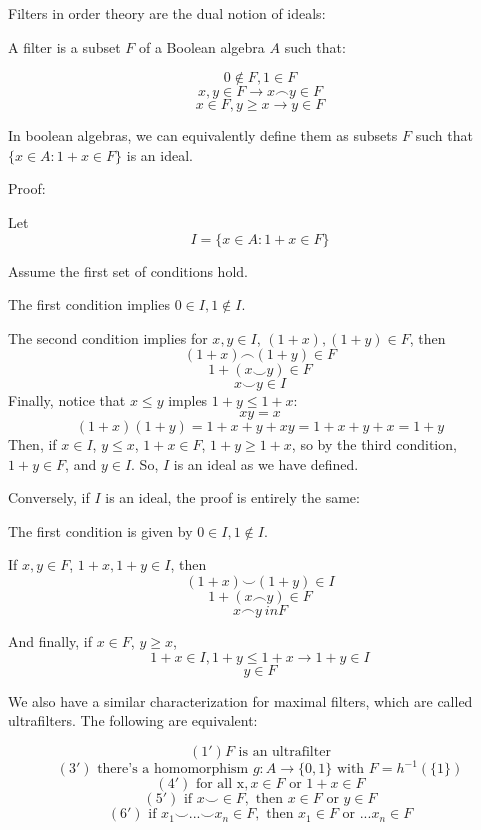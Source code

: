 \documentclass{article}
\begin{document}
      Filters in order theory are the dual notion of ideals:

      A filter is a subset $F$ of a Boolean algebra $A$ such that:

      \[0 \notin F, 1 \in F\]
      \[x, y \in F \rightarrow x \frown y \in F\]
      \[x \in F, y \geq x \rightarrow y \in F\]

      In boolean
      algebras, we can equivalently define them as subsets $F$ such that $\{x
      \in A: 1+x \in F\}$ is an ideal.

      Proof:

      Let
      \[I = \{x \in A: 1+x \in F\}\]


      Assume the first set of conditions hold.

      The first condition implies $0 \in I, 1 \notin I$.

      The second condition implies for $x, y \in I$, $(1+x), (1+y) \in F$, then
      \[(1+x) \frown (1+y) \in F\]
      \[1 + (x \smile y) \in F\]
      \[x \smile y \in I\]
      Finally, notice that $x \leq y$ imples $1+y \leq 1+x$:
      \[xy = x\]
      \[(1+x)(1+y) = 1 + x + y + xy = 1 + x + y + x = 1 + y\]
      Then, if $x \in I$, $y \leq x$, $1+x \in F$, $1+y \geq 1+x$, so by the
      third condition, $1+y \in F$, and $y \in I$.
      So, $I$ is an ideal as we have defined.

      Conversely, if $I$ is an ideal, the proof is entirely the same:
      
      The first condition is given by $0 \in I, 1 \notin I$.

      If $x, y \in F$, $1+x, 1+y \in I$, then
      \[(1+x) \smile (1+y) \in I\]
      \[1 + (x \frown y) \in F\]
      \[x \frown y \ in F\]

      And finally, if $x \in F$, $y \geq x$,
      \[1+x \in I, 1+y \leq 1+x \rightarrow 1+y \in I\]
      \[y \in F\]

      We also have a similar characterization for maximal filters, which are
      called ultrafilters. The following are equivalent:

      \[(1') F \text{ is an ultrafilter}\]
      \[(3') \text{ there's a homomorphism } g: A \rightarrow \{0,1\} \text{ with }
      F = h^{-1}(\{1\})\]
      \[(4') \text{ for all x}, x \in F \text{ or } 1+x \in F\]
      \[(5') \text{ if } x \smile \in F, \text{ then } x \in F \text{ or } y \in
      F\]
      \[(6') \text{ if } x_1 \smile ... \smile x_n \in F, \text{ then } x_1 \in
      F \text{ or } ... x_n \in F\]
\end{document}
